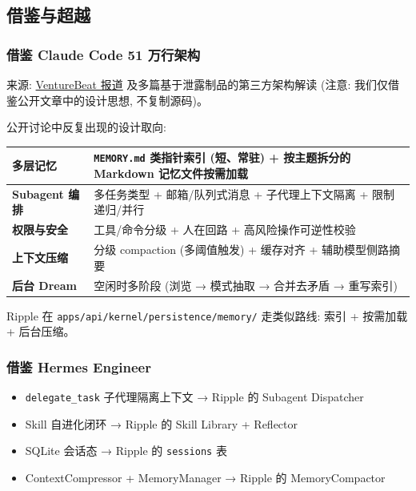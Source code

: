 \subsection{借鉴与超越}

\subsubsection{借鉴 Claude Code 51 万行架构}

来源: \href{https://venturebeat.com/technology/claude-codes-source-code-appears-to-have-leaked-heres-what-we-know}{VentureBeat 报道} 及多篇基于泄露制品的第三方架构解读 (注意: 我们仅借鉴公开文章中的设计思想, 不复制源码)。

公开讨论中反复出现的设计取向:

\begin{tabularx}{\textwidth}{>{\bfseries}l X}
    \toprule
    多层记忆 & \texttt{MEMORY.md} 类指针索引 (短、常驻) + 按主题拆分的 Markdown 记忆文件按需加载 \\
    \midrule
    Subagent 编排 & 多任务类型 + 邮箱/队列式消息 + 子代理上下文隔离 + 限制递归/并行 \\
    \midrule
    权限与安全 & 工具/命令分级 + 人在回路 + 高风险操作可逆性校验 \\
    \midrule
    上下文压缩 & 分级 compaction (多阈值触发) + 缓存对齐 + 辅助模型侧路摘要 \\
    \midrule
    后台 Dream & 空闲时多阶段 (浏览 → 模式抽取 → 合并去矛盾 → 重写索引) \\
    \bottomrule
\end{tabularx}

Ripple 在 \texttt{apps/api/kernel/persistence/memory/} 走类似路线: 索引 + 按需加载 + 后台压缩。

\subsubsection{借鉴 Hermes Engineer}

\begin{itemize}
    \item \texttt{delegate\_task} 子代理隔离上下文 → Ripple 的 Subagent Dispatcher
    \item Skill 自进化闭环 → Ripple 的 Skill Library + Reflector
    \item SQLite 会话态 → Ripple 的 \texttt{sessions} 表
    \item ContextCompressor + MemoryManager → Ripple 的 MemoryCompactor
\end{itemize}

